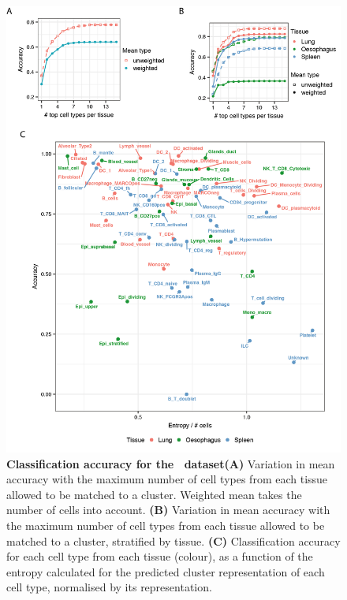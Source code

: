 \begin{figure}[pht!]
\centering
\includegraphics[scale=0.85]{Chapter4/Figs/chap4_madissoonAcc.png} %
\caption[Classification accuracy for the~\citep{madissoon_lung_2019} dataset]{\textbf{Classification accuracy for the~\citep{madissoon_lung_2019} dataset}\newline\textbf{(A)} Variation in mean accuracy with the maximum number of cell types from each tissue allowed to be matched to a cluster. Weighted mean takes the number of cells into account. \textbf{(B)} Variation in mean accuracy with the maximum number of cell types from each tissue allowed to be matched to a cluster, stratified by tissue. \textbf{(C)} Classification accuracy for each cell type from each tissue (colour), as a function of the entropy calculated for the predicted cluster representation of each cell type, normalised by its representation.}
\label{fig:chap4_accu}
\end{figure}

